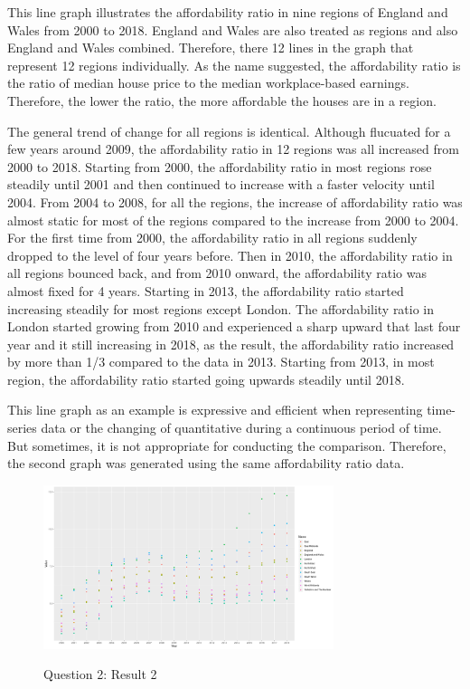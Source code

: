 \documentclass{article}
\begin{document}
This line graph illustrates the affordability ratio in nine regions of England and Wales from 2000 to 2018. 
England and Wales are also treated as regions and also England and Wales combined. Therefore, there 12 lines in the graph that represent 12 regions individually. As the name suggested, the affordability ratio is the ratio of median house price to the median workplace-based earnings. Therefore, the lower the ratio, the more 
affordable the houses are in a region.

The general trend of change for all regions is identical. Although flucuated for a few years around 2009, 
the affordability ratio in 12 regions was all increased from 2000 to 2018. Starting from 2000, the affordability ratio in most regions rose steadily until 2001 and then continued to increase with a faster velocity until 2004. 
From 2004 to 2008, for all the regions, the increase of affordability ratio was almost static for most of the regions compared to the increase from 2000 to 2004. For the first time from 2000, the affordability ratio in all regions suddenly dropped to the level of four years before. Then in 2010, the affordability ratio in all regions bounced back, and from 2010 onward, the affordability ratio was almost fixed for 4 years. Starting in 2013, 
the affordability ratio started increasing steadily for most regions except London. The affordability ratio in London started growing from 2010 and experienced a sharp upward that last four year and it still increasing in 2018, 
as the result, the affordability ratio increased by more than 1/3 compared to the data in 2013. Starting from 2013, 
in most region, the affordability ratio started going upwards steadily until 2018.

This line graph as an example is expressive and efficient when representing time-series data or the changing of quantitative during a continuous period of time. But sometimes, it is not appropriate for conducting the comparison. Therefore, the second graph was generated using the same affordability ratio data.

\begin{figure}[H]
  \begin{minipage}[b]{1.0\linewidth}
    \centering
    \centerline{\includegraphics[width=8.5cm]{Q2Geom_point}}
    \centerline{Question 2: Result 2}\medskip
  \end{minipage}
\end{figure}
\end{document}
